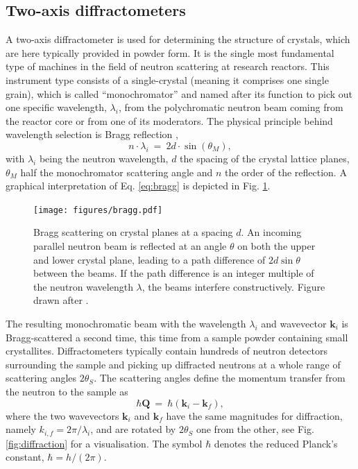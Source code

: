 \subsection{Two-axis diffractometers}

A two-axis diffractometer is used for determining the structure of crystals, which are here typically provided in powder form. It is the single most fundamental type of machines in the field of neutron scattering at research reactors. This instrument type consists of a single-crystal (meaning it comprises one single grain), which is called ``monochromator'' and named after its function to pick out one specific wavelength, $\lambda_i$, from the polychromatic neutron beam coming from the reactor core or from one of its moderators. The physical principle behind wavelength selection is Bragg reflection \cite[p. 68]{Gross2012},
\begin{equation}
	\label{eq:bragg}
	n \cdot \lambda_i \ =\  2 d \cdot \sin\left( \theta_M \right),
\end{equation}
with $\lambda_i$ being the neutron wavelength, $d$ the spacing of the crystal lattice planes, $\theta_M$ half the monochromator scattering angle and $n$ the order of the reflection. A graphical interpretation of Eq. \ref{eq:bragg} is depicted in Fig. \ref{fig:braggscattering}.

\begin{figure}[htb]
	\centering
	\texttt{[image: figures/bragg.pdf]}
	\caption{Bragg scattering on crystal planes at a spacing $d$. An incoming parallel neutron beam is reflected at an angle $\theta$ on both the upper and lower crystal plane, leading to a path difference of $2d \sin\theta$ between the beams. If the path difference is an integer multiple of the neutron wavelength $\lambda$, the beams interfere constructively. Figure drawn after \cite[p. 68, Fig. 2.7]{Gross2012}. }
	\label{fig:braggscattering}
\end{figure}

The resulting monochromatic beam with the wavelength $\lambda_i$ and wavevector $\bm{k}_i$ is Bragg-scattered a second time, this time from a sample powder containing small crystallites. Diffractometers typically contain hundreds of neutron detectors surrounding the sample and picking up diffracted neutrons at a whole range of scattering angles $2 \theta_S$. The scattering angles define the momentum transfer from the neutron to the sample as
\begin{equation}
	\label{eq:Q}
	\hbar \bm{Q} \ =\  \hbar \left( \bm{k}_i - \bm{k}_f \right),
\end{equation}
where the two wavevectors $\bm{k}_i$ and $\bm{k}_f$ have the same magnitudes for diffraction, namely $k_{i,f} = 2\pi / \lambda_i$, and are rotated by $2\theta_S$ one from the other, see Fig. \ref{fig:diffraction} for a visualisation. The symbol $\hbar$ denotes the reduced Planck's constant, $\hbar = h / \left( 2\pi \right)$.

